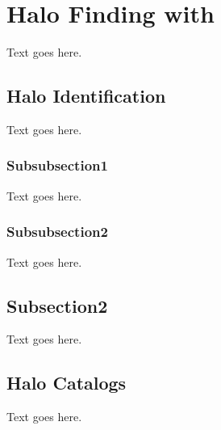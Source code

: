
%
%

\section{Halo Finding with \rockstar}
\label{sec:rockstar}



Text goes here.




\subsection{Halo Identification}
\label{subsec:rockstar--halo_identification}


Text goes here.



\subsubsection{Subsubsection1}
\label{subsubsec:rockstar--subsection1--subsubsection1}


Text goes here.



\subsubsection{Subsubsection2}
\label{subsubsec:rockstar--subsection1--subsubsection2}


Text goes here.




\subsection{Subsection2}
\label{subsec:rockstar--subsection2}


Text goes here.




\subsection{Halo Catalogs}
\label{subsec:rockstar--subsection2}


Text goes here.




